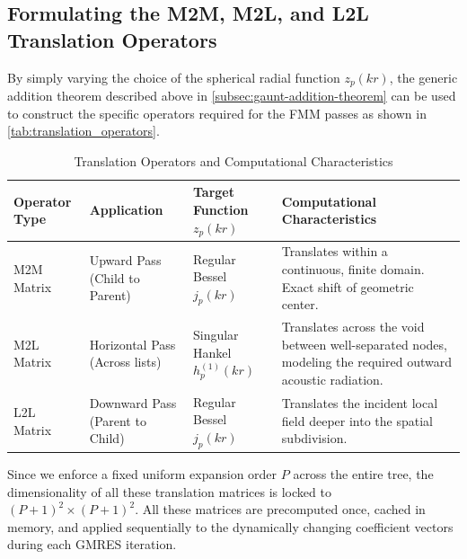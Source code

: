 \subsection{Formulating the \ac{M2M}, \ac{M2L}, and \ac{L2L} Translation Operators} \label{subsec:operator-formulation}
By simply varying the choice of the spherical radial function $z_p(kr)$, the generic addition theorem described above in \ref{subsec:gaunt-addition-theorem} can be used to construct the specific operators required for the \ac{FMM} passes as shown in \autoref{tab:translation_operators}.
\begin{table}[htbp]
\centering
\small %
\renewcommand{\arraystretch}{1.4} %
\setlength{\tabcolsep}{8pt} 
\begin{tabularx}{\textwidth}{ 
    >{\hsize}L 
    >{\hsize}L
    >{\hsize}L 
    >{\hsize}L 
}
\toprule
\textbf{Operator Type} & \textbf{Application} & \textbf{Target Function $z_p(kr)$} & \textbf{Computational Characteristics} \\
\midrule
M2M Matrix & Upward Pass \newline (Child to Parent)   & Regular Bessel $j_p(kr)$        & Translates within a continuous, finite domain. Exact shift of geometric center. \\
M2L Matrix & Horizontal Pass \newline (Across lists)  & Singular Hankel $h_p^{(1)}(kr)$ & Translates across the void between well-separated nodes, modeling the required outward acoustic radiation. \\
L2L Matrix & Downward Pass \newline (Parent to Child) & Regular Bessel $j_p(kr)$        & Translates the incident local field deeper into the spatial subdivision. \\
\bottomrule
\end{tabularx}
\caption{Translation Operators and Computational Characteristics}
\label{tab:translation_operators}
\end{table}

Since we enforce a fixed uniform expansion order $P$ across the entire tree, the dimensionality of all these translation matrices is locked to $(P+1)^2 \times (P+1)^2$. All these matrices are precomputed once, cached in memory, and applied sequentially to the dynamically changing coefficient vectors during each \acs{GMRES} iteration.